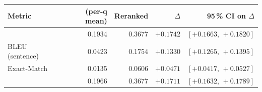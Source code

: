 \begin{tabular}{lrrrr}
    \toprule
    Metric & \bmtwofive{} (per-q mean) & Reranked & $\Delta$ & 95\,\% CI on $\Delta$ \\
    \midrule
    \rougel{} & 0.1934 & 0.3677 & $+0.1742$ & $[+0.1663,\,+0.1820]$ \\
    BLEU (sentence) & 0.0423 & 0.1754 & $+0.1330$ & $[+0.1265,\,+0.1395]$ \\
    Exact-Match & 0.0135 & 0.0606 & $+0.0471$ & $[+0.0417,\,+0.0527]$ \\
    \Tokenf{} & 0.1966 & 0.3677 & $+0.1711$ & $[+0.1632,\,+0.1789]$ \\
    \bottomrule
\end{tabular}

